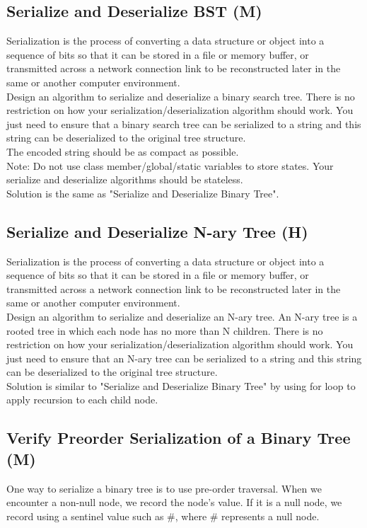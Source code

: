 \subsection{Serialize and Deserialize BST (M)}
Serialization is the process of converting a data structure or object into a sequence of bits so that it can be stored in a file or memory buffer, or transmitted across a network connection link to be reconstructed later in the same or another computer environment.\\

Design an algorithm to serialize and deserialize a binary search tree. There is no restriction on how your serialization/deserialization algorithm should work. You just need to ensure that a binary search tree can be serialized to a string and this string can be deserialized to the original tree structure.\\

The encoded string should be as compact as possible.\\

Note: Do not use class member/global/static variables to store states. Your serialize and deserialize algorithms should be stateless.\\

Solution is the same as "Serialize and Deserialize Binary Tree". 

\subsection{Serialize and Deserialize N-ary Tree (H)}
Serialization is the process of converting a data structure or object into a sequence of bits so that it can be stored in a file or memory buffer, or transmitted across a network connection link to be reconstructed later in the same or another computer environment.\\

Design an algorithm to serialize and deserialize an N-ary tree. An N-ary tree is a rooted tree in which each node has no more than N children. There is no restriction on how your serialization/deserialization algorithm should work. You just need to ensure that an N-ary tree can be serialized to a string and this string can be deserialized to the original tree structure.\\

Solution is similar to "Serialize and Deserialize Binary Tree" by using for loop to apply recursion to each child node.

\subsection{Verify Preorder Serialization of a Binary Tree (M)}
One way to serialize a binary tree is to use pre-order traversal. When we encounter a non-null node, we record the node's value. If it is a null node, we record using a sentinel value such as \#, where \# represents a null node. \\

